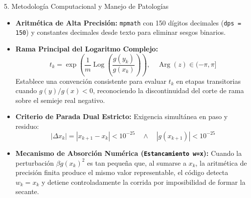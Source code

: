\documentclass[aspectratio=169,10pt]{beamer}
\begin{document}
\begin{frame}{5. Metodología Computacional y Manejo de Patologías}
  \begin{itemize}
    \item \textbf{Aritmética de Alta Precisión:} \texttt{mpmath} con 150 dígitos decimales (\texttt{dps = 150}) y constantes decimales desde texto para eliminar sesgos binarios.
    \item \textbf{Rama Principal del Logaritmo Complejo:}
    $$t_k = \exp\left(\frac{1}{m}\operatorname{Log}\left(\frac{g(y_k)}{g(x_k)}\right)\right), \quad \operatorname{Arg}(z)\in(-\pi,\pi]$$
    Establece una convención consistente para evaluar $t_k$ en etapas transitorias cuando $g(y)/g(x) < 0$, reconociendo la discontinuidad del corte de rama sobre el semieje real negativo.
    \item \textbf{Criterio de Parada Dual Estricto:} Exigencia simultánea en paso y residuo:
    $$|\Delta x_k| = |x_{k+1}-x_k| < 10^{-25} \quad \wedge \quad |g(x_{k+1})| < 10^{-25}$$
    \item \textbf{Mecanismo de Absorción Numérica (\texttt{Estancamiento w=x}):}
    Cuando la perturbación $\beta g(x_k)^2$ es tan pequeña que, al sumarse a $x_k$, la aritmética de precisión finita produce el mismo valor representable, el código detecta $w_k = x_k$ y detiene controladamente la corrida por imposibilidad de formar la secante.
  \end{itemize}
\end{frame}
\end{document}
